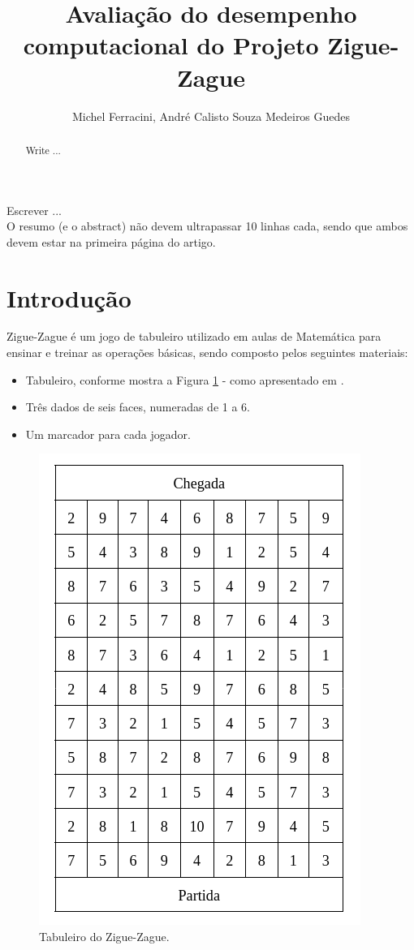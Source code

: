 \documentclass[12pt]{article}
\title{Avaliação do desempenho computacional do Projeto Zigue-Zague}
\author{Michel Ferracini\inst{1}, André Calisto Souza Medeiros Guedes\inst{1}}
\begin{document}
 

\maketitle

\begin{abstract}
  Write ...
\end{abstract}
     
\begin{resumo} 
  Escrever ...\\
  O resumo (e o abstract) não devem ultrapassar 10 linhas cada, sendo que ambos devem estar na primeira
  página do artigo.
\end{resumo}

\section{Introdução}

Zigue-Zague é um jogo de tabuleiro utilizado em aulas de Matemática para ensinar e treinar as operações básicas, sendo composto pelos seguintes materiais:

\begin{itemize}
	\item Tabuleiro, conforme mostra a Figura \ref{tabuleiro-zigue-zague} - como apresentado em \cite{silvakodama:2007}.
	\item Três dados de seis faces, numeradas de 1 a 6.
	\item Um marcador para cada jogador.
\end{itemize}

\begin{figure}[ht]
	\centering
	\includegraphics[width=0.4\linewidth]{img/tabuleiro}
	\caption{Tabuleiro do Zigue-Zague.}
	\label{tabuleiro-zigue-zague}
\end{figure}
\end{document}
